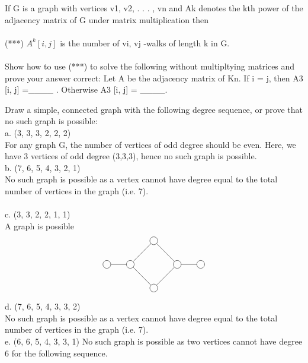 \documentclass[12pt]{article}
\newenvironment{question}[2][Question]{\begin{trivlist}
\item[\hskip \labelsep {\bfseries #1}\hskip \labelsep {\bfseries #2.}]}{\end{trivlist}}
\begin{document}
\begin{question}{5}
If G is a graph with vertices v1, v2, . . . , vn and Ak denotes the kth power of the adjacency matrix
of G under matrix multiplication then \\ \\
(***) $A^{k}[i, j]$ is the number of vi, vj -walks of length k in G. \\ \\
Show how to use (***) to solve the following without multipltying matrices and prove your answer
correct: Let A be the adjacency matrix of Kn. If i = j, then A3
[i, j] =\_\_\_\_ . Otherwise
A3
[i, j] = \_\_\_\_.
\end{question}

\begin{question}{6}
Draw a simple, connected graph with the following degree sequence, or prove that no such graph
is possible: \\
a. (3, 3, 3, 2, 2, 2) \\
For any graph G, the number of vertices of odd degree should be even. Here, we have 3 vertices of odd degree (3,3,3), hence no such graph is possible. \\
b. (7, 6, 5, 4, 3, 2, 1) \\
No such graph is possible as a vertex cannot have degree equal to the total number of
vertices in the graph (i.e. 7). \\ \\
c. (3, 3, 2, 2, 1, 1) \\
A graph is possible \\
\begin{align*}
\begin{tikzpicture}
\node[shape=circle,draw=black] (A) at (-1,0) {};
\node[shape=circle,draw=black] (B) at (0,1) {};
\node[shape=circle,draw=black] (C) at (1,0) {};
\node[shape=circle,draw=black] (D) at (0,-1) {};
\node[shape=circle,draw=black] (E) at (-2,0) {};
\node[shape=circle,draw=black] (F) at (2,0) {};
\path [] (A) edge node[left] {} (B);
\path [] (B) edge node[left] {} (C);
\path [] (C) edge node[left] {} (D);
\path [] (D) edge node[left] {} (A);
\path [] (A) edge node[left] {} (E);
\path [] (C) edge node[left] {} (F);
\end{tikzpicture}
\end{align*}
d. (7, 6, 5, 4, 3, 3, 2) \\
No such graph is possible as a vertex cannot have degree equal to the total number of
vertices in the graph (i.e. 7). \\
e. (6, 6, 5, 4, 3, 3, 1)
No such graph is possible as two vertices cannot have degree 6 for the following sequence.
\end{question}
\end{document}
